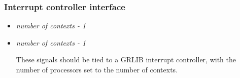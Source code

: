 \subsubsection{Interrupt controller interface}
\label{sec:rvsysgr-iface-irq}

\begin{itemize}

\item {}\textit{number of contexts - 1}\code{)}
\item {}\textit{number of contexts - 1}\code{)}

These signals should be tied to a GRLIB  interrupt controller, with 
the number of processors set to the number of \rvex{} contexts.

\end{itemize}
